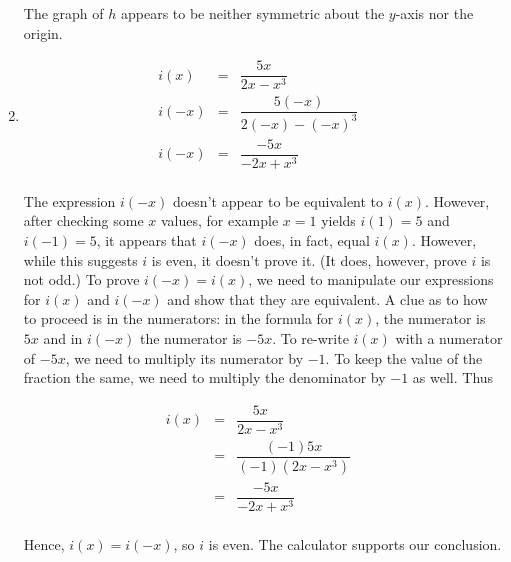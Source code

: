 \begin{ex}
\begin{enumerate}
\begin{center}
\end{center}

The graph of $h$ appears to be neither symmetric about the $y$-axis nor the origin.

\setlength{\extrarowheight}{8pt}

\item  \[ \begin{array}{rclr}   

i(x) & = & \dfrac{5x}{2x - x^3} & \\ 
i(-x) & = & \dfrac{5(-x)}{2(-x) - (-x)^3} & \\ 
i(-x) & = & \dfrac{-5x}{-2x + x^3} & \\  

\end{array} \]

\setlength{\extrarowheight}{2pt}

The expression  $i(-x)$ doesn't appear to be equivalent to $i(x)$.  However, after checking some $x$ values, for example $x=1$ yields $i(1) = 5$ and $i(-1 )= 5$, it appears that $i(-x)$ does, in fact, equal $i(x)$.  However, while this suggests  $i$ is even, it doesn't prove it.  (It does, however, prove $i$ is not odd.)  To prove $i(-x) = i(x)$, we need to manipulate our expressions for $i(x)$ and $i(-x)$ and show that they are equivalent.  A clue as to how to proceed is in the numerators: in the formula for $i(x)$, the numerator is $5x$ and in $i(-x)$ the numerator is $-5x$.  To re-write $i(x)$ with a numerator of $-5x$, we need to multiply its numerator by $-1$.  To keep the value of the fraction the same, we need to multiply the denominator by $-1$ as well.  Thus

\setlength{\extrarowheight}{8pt}

 \[ \begin{array}{rclr}   

i(x) & = & \dfrac{5x}{2x - x^3} & \\ 
& = & \dfrac{(-1) 5x}{(-1)\left(2x - x^3\right)} & \\ 
& = & \dfrac{-5x}{-2x + x^3} & \\  

\end{array} \]

\setlength{\extrarowheight}{2pt}

Hence, $i(x) = i(-x)$, so $i$ is even.  The calculator supports our conclusion.

\begin{center}

\begin{tabular}{cc}


\end{tabular}
\end{center}
\end{enumerate}
\end{ex}
